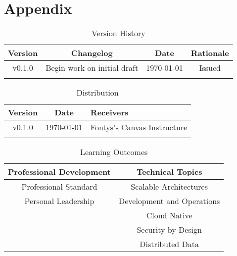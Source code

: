 \documentclass{article}
\begin{document}
\newpage
\section{Appendix}
\label{appendix}
    \begin{table}[h]
        \begin{tabular}{ | c | c | c | c | }
            \hline \textbf{Version} & \textbf{Changelog} & \textbf{Date} & \textbf{Rationale} \\
            \hline v0.1.0 & Begin work on initial draft & \today & Issued \\
            \hline & & & \\
            \hline
        \end{tabular}
        \caption{Version History}
        \label{tab:version-history}
    \end{table}

    \begin{table}[h]
        \begin{tabular}{ | c | c | m{20em} | }
            \hline \textbf{Version} & \textbf{Date} & \textbf{Receivers} \\
            \hline v0.1.0 & \today & Fontys's Canvas Instructure \\
            \hline & & \\
            \hline
        \end{tabular}
        \caption{Distribution}
        \label{tab:distribution}
    \end{table}

    \begin{table}[h!]
        \centering
        \begin{tabular}{|c|c|}
             \hline \textbf{Professional Development} & \textbf{Technical Topics} \\
             \hline Professional Standard & Scalable Architectures \\
             \hline Personal Leadership & Development and Operations \\
             \hline & Cloud Native \\
             \hline & Security by Design \\
             \hline & Distributed Data \\
             \hline 
        \end{tabular}
        \caption{Learning Outcomes}
        \label{tab:learning-outcomes}
    \end{table}

    \newpage
    \printbibliography
\end{document}
